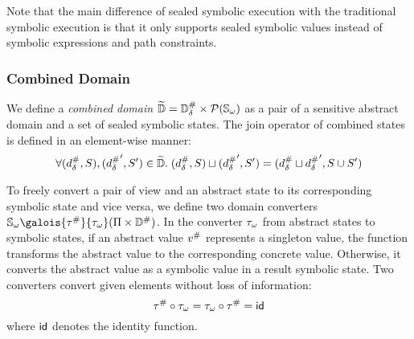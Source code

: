 Note that the main difference of sealed symbolic execution with the traditional
symbolic execution is that it only supports sealed symbolic values instead of
symbolic expressions and path constraints.


\subsubsection{Combined Domain}

We define a \textit{combined domain} $\widetilde{\mathbb{D}} = {\mathbb{D}}^{\#}_\delta \times
\mathcal{P}({\mathbb{S}}_\omega)$ as a pair of a sensitive abstract domain and a set of
sealed symbolic states.   The join operator of combined states is defined in an
element-wise manner:
\[
  \forall ({d}^{\#}_\delta, S), ({{d}^{\#}_\delta}', S') \in \widetilde{\mathbb{D}}. \;
  ({d}^{\#}_\delta, S) \sqcup ({{d}^{\#}_\delta}', S') = ({d}^{\#}_\delta \sqcup {{d}^{\#}_\delta}', S \cup S')
\]

To freely convert a pair of view and an abstract state to its
corresponding symbolic state and vice versa, we define two domain converters
$\symbstset \galois{\saconverter}{\asconverter} (\viewset \times \absdom)$.  In
the converter ${\tau}_\omega$ from abstract states to symbolic states, if an
abstract value ${v}^{\#}$ represents a singleton value, the function transforms
the abstract value to the corresponding concrete value.  Otherwise, it converts
the abstract value as a symbolic value in a result symbolic state.  Two
converters convert given elements without loss of information:
\[
  {\tau}^{\#} \circ {\tau}_\omega = {\tau}_\omega \circ {\tau}^{\#} = \textsf{id}
\]
where $\textsf{id}$ denotes the identity function.

